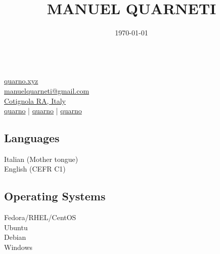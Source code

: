 \documentclass{article}
\title{\HUGE \bfseries MANUEL QUARNETI \\[-20pt]}
\author{}
\date{\today}
\begin{document}
\setmainfont{Inter}

\begin{paracol}{2}

\begin{tcolorbox}[colback=white]
    \small \center

    \vspace{20pt}

     \\[20pt]

    \href{https://quarno.xyz/}{ quarno.xyz} \\[8pt]
    \href{mailto:manuelquarneti@gmail.com}{ manuelquarneti@gmail.com} \\[8pt]
    \href{https://www.openstreetmap.org/relation/43112}{ Cotignola RA, Italy} \\[8pt]
    \href{https://github.com/quarno}{ quarno} \hfill | \hfill
    \href{https://www.linkedin.com/in/quarno}{ quarno} \hfill | \hfill
    \href{https://t.me/quarno}{ quarno}

    \vspace{20pt}
    \tcblower
    \vspace{20pt}

    \center

    \subsection*{Languages}
     Italian (Mother tongue) \\[4pt]
     English (CEFR C1)

    \subsection*{Operating Systems}
     Fedora/RHEL/CentOS \\[4pt]
     Ubuntu \\[4pt]
     Debian \\[4pt]
     Windows


\end{tcolorbox}
\end{paracol}
\end{document}
